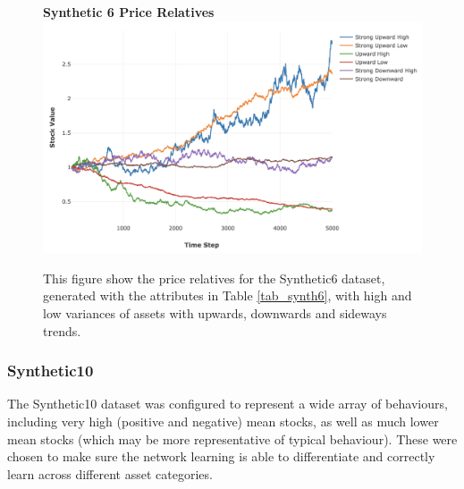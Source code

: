 \documentclass[a4paper,11pt,oneside]{article}
\theoremstyle{plain}
\theoremstyle{definition}
\begin{document}
	\begin{figure}[H]
		\centering
		\textbf{Synthetic 6 Price Relatives}
		\includegraphics[scale=0.35]{images/results/prices/synthetic6_prices.png} 
		\caption[Synthetic 6 Price Relatives]{This figure show the price relatives for the Synthetic6 dataset, generated with the attributes in Table \ref{tab_synth6}, with high and low variances of assets with upwards, downwards and sideways trends.}
		\label{figure-synthetic6_prices}
	\end{figure}
	
	\subsubsection{Synthetic10}\label{dataset_synthetic10}
	
	The Synthetic10 dataset was configured to represent a wide array of behaviours, including very high (positive and negative) mean stocks, as well as much lower mean stocks (which may be more representative of typical behaviour). These were chosen to make sure the network learning is able to differentiate and correctly learn across different asset categories.
	
\end{document}
